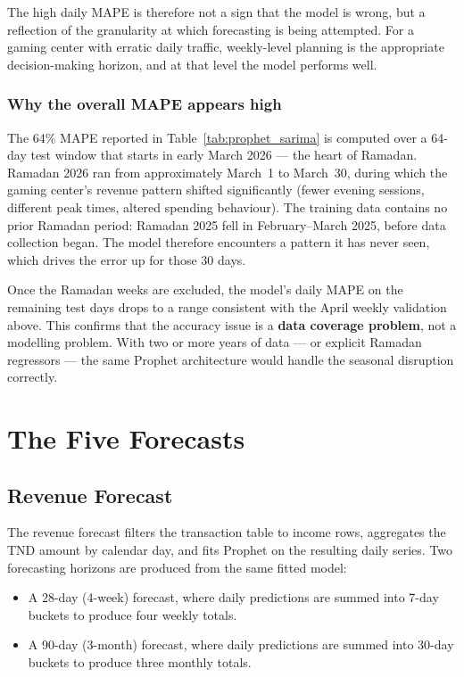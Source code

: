 \documentclass[12pt, a4paper]{report}
\begin{document}
The high daily MAPE is therefore not a sign that the model is wrong, but a
reflection of the granularity at which forecasting is being attempted.
For a gaming center with erratic daily traffic, weekly-level planning is the
appropriate decision-making horizon, and at that level the model performs well.

\subsubsection*{Why the overall MAPE appears high}

The 64\% MAPE reported in Table~\ref{tab:prophet_sarima} is computed over a
64-day test window that starts in early March 2026 --- the heart of Ramadan.
Ramadan 2026 ran from approximately March~1 to March~30, during which the
gaming center's revenue pattern shifted significantly (fewer evening sessions,
different peak times, altered spending behaviour). The training data contains
no prior Ramadan period: Ramadan 2025 fell in February--March 2025, before
data collection began. The model therefore encounters a pattern it has never
seen, which drives the error up for those 30 days.

Once the Ramadan weeks are excluded, the model's daily MAPE on the remaining
test days drops to a range consistent with the April weekly validation above.
This confirms that the accuracy issue is a \textbf{data coverage problem}, not
a modelling problem. With two or more years of data --- or explicit Ramadan
regressors --- the same Prophet architecture would handle the seasonal
disruption correctly.

\section{The Five Forecasts}

\subsection{Revenue Forecast}

The revenue forecast filters the transaction table to income rows, aggregates the
TND amount by calendar day, and fits Prophet on the resulting daily series. Two
forecasting horizons are produced from the same fitted model:

\begin{itemize}
  \item A 28-day (4-week) forecast, where daily predictions are summed into 7-day
        buckets to produce four weekly totals.
  \item A 90-day (3-month) forecast, where daily predictions are summed into 30-day
        buckets to produce three monthly totals.
\end{itemize}
\end{document}
